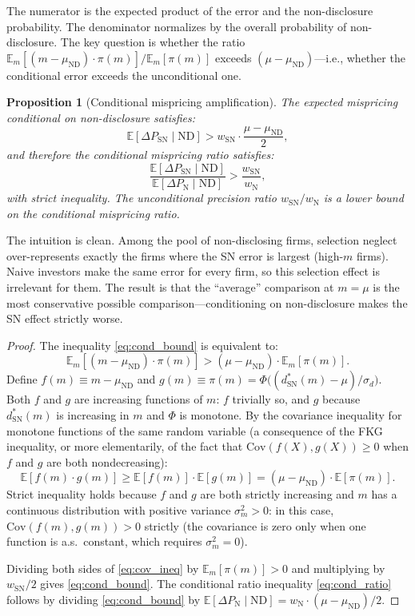 \documentclass[12pt]{article}
\theoremstyle{plain}
\newtheorem{proposition}{Proposition}
\theoremstyle{definition}
\newcommand{\E}{\mathbb{E}}
\newcommand{\Cov}{\mathrm{Cov}}
\newcommand{\ND}{\mathrm{ND}}
\newcommand{\SN}{\mathrm{SN}}
\newcommand{\N}{\mathrm{N}}
\begin{document}
The numerator is the expected product of the error and the non-disclosure probability. The denominator normalizes by the overall probability of non-disclosure. The key question is whether the ratio $\E_m[(m - \mu_\ND) \cdot \pi(m)] / \E_m[\pi(m)]$ exceeds $(\mu - \mu_\ND)$---i.e., whether the conditional error exceeds the unconditional one.

\begin{proposition}[Conditional mispricing amplification]
\label{prop:conditional}
The expected mispricing conditional on non-disclosure satisfies:
\begin{equation}
\E[\Delta P_\SN \mid \ND] > w_\SN \cdot \frac{\mu - \mu_\ND}{2},
\label{eq:cond_bound}
\end{equation}
and therefore the conditional mispricing ratio satisfies:
\begin{equation}
\frac{\E[\Delta P_\SN \mid \ND]}{\E[\Delta P_\N \mid \ND]} > \frac{w_\SN}{w_\N},
\label{eq:cond_ratio}
\end{equation}
with strict inequality. The unconditional precision ratio $w_\SN/w_\N$ is a \emph{lower bound} on the conditional mispricing ratio.
\end{proposition}

The intuition is clean. Among the pool of non-disclosing firms, selection neglect over-represents exactly the firms where the SN error is largest (high-$m$ firms). Naive investors make the same error for every firm, so this selection effect is irrelevant for them. The result is that the ``average'' comparison at $m = \mu$ is the most conservative possible comparison---conditioning on non-disclosure makes the SN effect strictly worse.

\begin{proof}
The inequality \eqref{eq:cond_bound} is equivalent to:
\begin{equation}
\E_m\!\left[(m - \mu_\ND) \cdot \pi(m)\right] > (\mu - \mu_\ND) \cdot \E_m[\pi(m)].
\label{eq:cov_ineq}
\end{equation}
Define $f(m) \equiv m - \mu_\ND$ and $g(m) \equiv \pi(m) = \Phi\bigl((d^*_\SN(m) - \mu)/\sigma_d\bigr)$. Both $f$ and $g$ are increasing functions of $m$: $f$ trivially so, and $g$ because $d^*_\SN(m)$ is increasing in $m$ and $\Phi$ is monotone. By the covariance inequality for monotone functions of the same random variable (a consequence of the FKG inequality, or more elementarily, of the fact that $\Cov(f(X), g(X)) \geq 0$ when $f$ and $g$ are both nondecreasing):
\[
\E[f(m) \cdot g(m)] \geq \E[f(m)] \cdot \E[g(m)] = (\mu - \mu_\ND) \cdot \E[\pi(m)].
\]
Strict inequality holds because $f$ and $g$ are both strictly increasing and $m$ has a continuous distribution with positive variance $\sigma_m^2 > 0$: in this case, $\Cov(f(m), g(m)) > 0$ strictly (the covariance is zero only when one function is a.s.\ constant, which requires $\sigma_m^2 = 0$).

Dividing both sides of \eqref{eq:cov_ineq} by $\E_m[\pi(m)] > 0$ and multiplying by $w_\SN/2$ gives \eqref{eq:cond_bound}. The conditional ratio inequality \eqref{eq:cond_ratio} follows by dividing \eqref{eq:cond_bound} by $\E[\Delta P_\N \mid \ND] = w_\N \cdot (\mu - \mu_\ND)/2$.
\end{proof}
\end{document}

